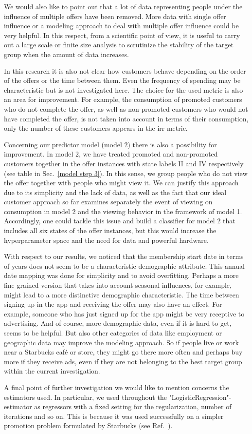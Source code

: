 \documentclass[11pt]{article} %
\begin{document}
We would also like to point out that a lot of data representing people under the influence of multiple offers have been removed. More data with single offer influence or a modeling approach to deal with multiple offer influence could be very helpful. 
In this respect, from a scientific point of view, it is useful to carry out a large scale or finite size analysis to scrutinize the stability of the target group when the amount of data increases.

In this research it is also not clear how customers behave depending on the order of the offers or the time between them. Even the frequency of spending may be characteristic but is not investigated here.
The choice for the used metric is also an area for improvement. For example, the consumption of promoted customers who do not complete the offer, as well as non-promoted customers who would not have completed the offer, is not taken into account in terms of their consumption, only the number of these customers appears in the irr metric.

Concerning our predictor model (model 2) there is also a possibility for improvement. In model 2, we have treated promoted and non-promoted customers together in the offer instances with state labels II and IV respectively (see table in Sec.~\ref{model step 3}). 
In this sense, we group people who do not view the offer together with people who might view it. We can justify this approach due to its simplicity and the lack of data, as well as the fact that our ideal customer approach so far examines separately the event of viewing on consumption in model 2 and the viewing behavior in the framework of model 1.
Accordingly, one could tackle this issue and build a classifier for model 2 that includes all six states of the offer instances, but this would increase the hyperparameter space and the need for data and powerful hardware.

With respect to our results, we noticed that the membership start date in terms of years does not seem to be a characteristic demographic attribute.
This annual date mapping was done for simplicity and to avoid overfitting.
Perhaps a more fine-grained version that takes into account seasonal influences, for example, might lead to a more distinctive demographic characteristic.
The time between signing up in the app and receiving the offer may also have an effect. For example, someone who has just signed up for the app might be very receptive to advertising.
And of course, more demographic data, even if it is hard to get, seems to be helpful. But also other categories of data like employment or geographic data may improve the modeling approach. So if people live or work near a Starbucks café or store, they might go there more often and perhaps buy more if they receive ads, even if they are not belonging to the best target group within the current investigation.

A final point of further investigation we would like to mention concerns the estimators used. In particular, we used throughout the "LogisticRegression"-estimator as regressors with a fixed setting for the regularization, number of iterations and so on.
This is because it was used successfully on a simpler promotion problem formulated by Starbucks (see  Ref.~\cite{b}).
\end{document}
